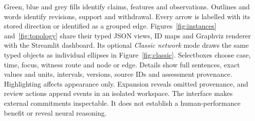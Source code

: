 Green, blue and grey fills identify claims, features and observations.
Outlines and words identify revisions, support and withdrawal. Every arrow is
labelled with its stored direction or identified as a grouped edge.
Figures~\ref{fig:instances} and~\ref{fig:topology} share their typed JSON views,
ID maps and Graphviz renderer with the Streamlit dashboard.
Its optional \emph{Classic network} mode draws the same typed objects as individual
ellipses in Figure~\ref{fig:classic}. Selectboxes choose case, time, focus, witness
route and node or edge. Details show full sentences, exact values and units,
intervals, versions, source IDs and assessment provenance. Highlighting affects
appearance only. Expansion reveals omitted provenance, and review actions append
events in an isolated workspace. The interface makes external commitments
inspectable. It does not establish a human-performance benefit or reveal neural
reasoning.
